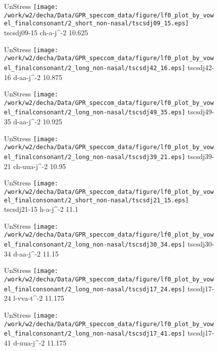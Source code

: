 \documentclass{article}
\begin{document}
\begin{figure}[t]
\begin{minipage}[b]{.24\textwidth}
UnStress
\centering
\texttt{[image: /work/w2/decha/Data/GPR\_speccom\_data/figure/lf0\_plot\_by\_vowel\_finalconsonant/2\_short\_non-nasal/tscsdj09\_15.eps]}
tscsdj09-15 ch-a-j\textasciicircum-2 10.625
\end{minipage}
\begin{minipage}[b]{.24\textwidth}
UnStress
\centering
\texttt{[image: /work/w2/decha/Data/GPR\_speccom\_data/figure/lf0\_plot\_by\_vowel\_finalconsonant/2\_long\_non-nasal/tscsdj42\_16.eps]}
tscsdj42-16 d-aa-j\textasciicircum-2 10.875
\end{minipage}
\begin{minipage}[b]{.24\textwidth}
UnStress
\centering
\texttt{[image: /work/w2/decha/Data/GPR\_speccom\_data/figure/lf0\_plot\_by\_vowel\_finalconsonant/2\_long\_non-nasal/tscsdj49\_35.eps]}
tscsdj49-35 d-aa-j\textasciicircum-2 10.925
\end{minipage}
\begin{minipage}[b]{.24\textwidth}
UnStress
\centering
\texttt{[image: /work/w2/decha/Data/GPR\_speccom\_data/figure/lf0\_plot\_by\_vowel\_finalconsonant/2\_long\_non-nasal/tscsdj39\_21.eps]}
tscsdj39-21 ch-uua-j\textasciicircum-2 10.95
\end{minipage}
\end{figure}

\begin{figure}[t]
\begin{minipage}[b]{.24\textwidth}
UnStress
\centering
\texttt{[image: /work/w2/decha/Data/GPR\_speccom\_data/figure/lf0\_plot\_by\_vowel\_finalconsonant/2\_short\_non-nasal/tscsdj21\_15.eps]}
tscsdj21-15 h-a-j\textasciicircum-2 11.1
\end{minipage}
\begin{minipage}[b]{.24\textwidth}
UnStress
\centering
\texttt{[image: /work/w2/decha/Data/GPR\_speccom\_data/figure/lf0\_plot\_by\_vowel\_finalconsonant/2\_long\_non-nasal/tscsdj30\_34.eps]}
tscsdj30-34 d-aa-j\textasciicircum-2 11.15
\end{minipage}
\begin{minipage}[b]{.24\textwidth}
UnStress
\centering
\texttt{[image: /work/w2/decha/Data/GPR\_speccom\_data/figure/lf0\_plot\_by\_vowel\_finalconsonant/2\_long\_non-nasal/tscsdj17\_24.eps]}
tscsdj17-24 l-vva-t\textasciicircum-2 11.175
\end{minipage}
\begin{minipage}[b]{.24\textwidth}
UnStress
\centering
\texttt{[image: /work/w2/decha/Data/GPR\_speccom\_data/figure/lf0\_plot\_by\_vowel\_finalconsonant/2\_long\_non-nasal/tscsdj17\_41.eps]}
tscsdj17-41 d-uua-j\textasciicircum-2 11.175
\end{minipage}
\end{figure}
\end{document}
